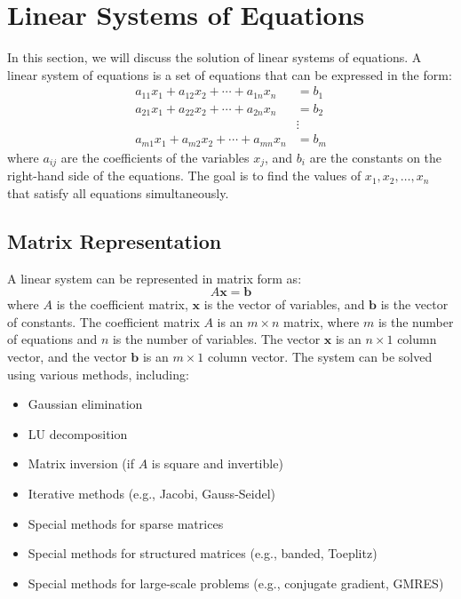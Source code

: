 \section{Linear Systems of Equations}
In this section, we will discuss the solution of linear systems of equations. A linear system of equations is a set of equations that can be expressed in the form:
\begin{equation*}
	\begin{aligned}
		a_{11}x_1 + a_{12}x_2 + \cdots + a_{1n}x_n & = b_1  \\
		a_{21}x_1 + a_{22}x_2 + \cdots + a_{2n}x_n & = b_2  \\
		                                           & \vdots \\
		a_{m1}x_1 + a_{m2}x_2 + \cdots + a_{mn}x_n & = b_m
	\end{aligned}
\end{equation*}
where \( a_{ij} \) are the coefficients of the variables \( x_j \), and \( b_i \) are the constants on the right-hand side of the equations. The goal is to find the values of \( x_1, x_2, \ldots, x_n \) that satisfy all equations simultaneously.
\subsection{Matrix Representation}
A linear system can be represented in matrix form as:
\begin{equation*}
	A \mathbf{x} = \mathbf{b}
\end{equation*}
where \( A \) is the coefficient matrix, \( \mathbf{x} \) is the vector of variables, and \( \mathbf{b} \) is the vector of constants. The coefficient matrix \( A \) is an \( m \times n \) matrix, where \( m \) is the number of equations and \( n \) is the number of variables.
The vector \( \mathbf{x} \) is an \( n \times 1 \) column vector, and the vector \( \mathbf{b} \) is an \( m \times 1 \) column vector. The system can be solved using various methods, including:
\begin{itemize}[label=\(-\)]
	\item Gaussian elimination
	\item LU decomposition
	\item Matrix inversion (if \( A \) is square and invertible)
	\item Iterative methods (e.g., Jacobi, Gauss-Seidel)
	\item Special methods for sparse matrices
	\item Special methods for structured matrices (e.g., banded, Toeplitz)
	\item Special methods for large-scale problems (e.g., conjugate gradient, GMRES)
\end{itemize}
